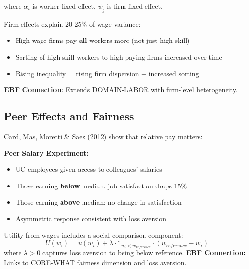 where $\alpha_i$ is worker fixed effect, $\psi_j$ is firm fixed effect.

\begin{axiom}
\label{ax:dc5}
Firm effects explain 20-25\% of wage variance:
\begin{itemize}
    \item High-wage firms pay \textbf{all} workers more (not just high-skill)
    \item Sorting of high-skill workers to high-paying firms increased over time
    \item Rising inequality = rising firm dispersion + increased sorting
\end{itemize}
\textbf{EBF Connection:} Extends DOMAIN-LABOR with firm-level heterogeneity.
\end{axiom}

\subsection{Peer Effects and Fairness}

Card, Mas, Moretti \& Saez (2012) show that relative pay matters:

\begin{tcolorbox}[colback=yellow!10!white, colframe=yellow!75!black]
\textbf{Peer Salary Experiment:}
\begin{itemize}
    \item UC employees given access to colleagues' salaries
    \item Those earning \textbf{below} median: job satisfaction drops 15\%
    \item Those earning \textbf{above} median: no change in satisfaction
    \item Asymmetric response consistent with loss aversion
\end{itemize}
\end{tcolorbox}

\begin{axiom}
\label{ax:dc6}
Utility from wages includes a social comparison component:
\begin{equation}
U(w_i) = u(w_i) + \lambda \cdot \mathbb{1}_{w_i < w_{reference}} \cdot (w_{reference} - w_i)
\end{equation}
where $\lambda > 0$ captures loss aversion to being below reference.
\textbf{EBF Connection:} Links to CORE-WHAT fairness dimension and loss aversion.
\end{axiom}


